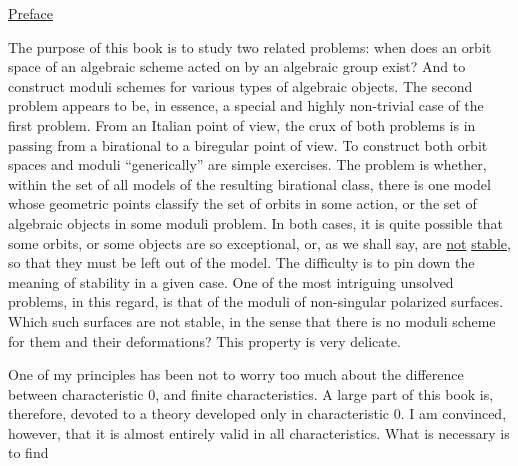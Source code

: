 
\begin{center}
\uline{Preface}
\end{center}

The purpose of this book is to study two related problems: when does an orbit space of an algebraic scheme acted on by an algebraic group exist? And to construct moduli schemes for various types of algebraic objects. The second problem appears to be, in essence, a special and highly non-trivial case of the first problem. From an Italian point of view, the crux of both problems is in passing from a birational to a biregular point of view. To construct both orbit spaces and moduli ``generically'' are simple exercises. The problem is whether, within the set of all models of the resulting birational class, there is one model whose geometric points classify the set of orbits in some action, or the set of algebraic objects in some moduli problem. In both cases, it is quite possible that some orbits, or some objects are so exceptional, or, as we shall say, are \uline{not} \uline{stable}, so that they must be left out of the model. The difficulty is to pin down the meaning of stability in a given case. One of the most intriguing unsolved problems, in this regard, is that of the moduli of non-singular polarized surfaces. Which such surfaces are not stable, in the sense that there is no moduli scheme for them and their deformations? This property is very delicate.

One of my principles has been not to worry too much about the difference between characteristic $0$, and finite characteristics. A large part of this book is, therefore, devoted to a theory developed only in characteristic $0$. I am convinced, however, that it is almost entirely valid in all characteristics. What is necessary is to find
